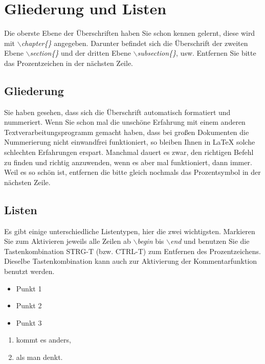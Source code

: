 \documentclass[ngerman,parskip]{scrbook}
\begin{document}
\chapter{Gliederung und Listen}

Die oberste Ebene der Überschriften haben Sie schon kennen gelernt, diese wird
mit \textit{\textit{$\backslash$chapter\{\}}} angegeben. Darunter befindet sich
die Überschrift der zweiten Ebene \textit{\textit{$\backslash$section\{\}}} und
der dritten Ebene \textit{$\backslash$subsection\{\}}, usw. Entfernen Sie bitte
das Prozentzeichen in der nächsten Zeile.

\section{Gliederung}

Sie haben gesehen, dass sich die Überschrift automatisch formatiert und
nummeriert. Wenn Sie schon mal die unschöne Erfahrung mit einem anderen
Textverarbeitungsprogramm gemacht haben, dass bei großen Dokumenten die
Nummerierung nicht einwandfrei funktioniert, so bleiben Ihnen in \LaTeX\;
solche schlechten Erfahrungen erspart. Manchmal dauert es zwar, den richtigen
Befehl zu finden und richtig anzuwenden, wenn es aber mal funktioniert, dann
immer. Weil es so schön ist, entfernen die bitte gleich nochmals das
Prozentsymbol in der nächsten Zeile.

\section{Listen}

Es gibt einige unterschiedliche Listentypen, hier die zwei wichtigsten.
Markieren Sie zum Aktivieren jeweils alle Zeilen ab \textit{$\backslash$begin}
bis \textit{$\backslash$end} und benutzen Sie die Tastenkombination STRG-T
(bzw. CTRL-T) zum Entfernen des Prozentzeichens. Dieselbe Tastenkombination
kann auch zur Aktivierung der Kommentarfunktion benutzt werden.

\begin{itemize}
	\item Punkt 1
	\item Punkt 2
	\item Punkt 3
\end{itemize}

\begin{enumerate}
	\item kommt es anders,
	\item als man denkt.
\end{enumerate}
\end{document}
